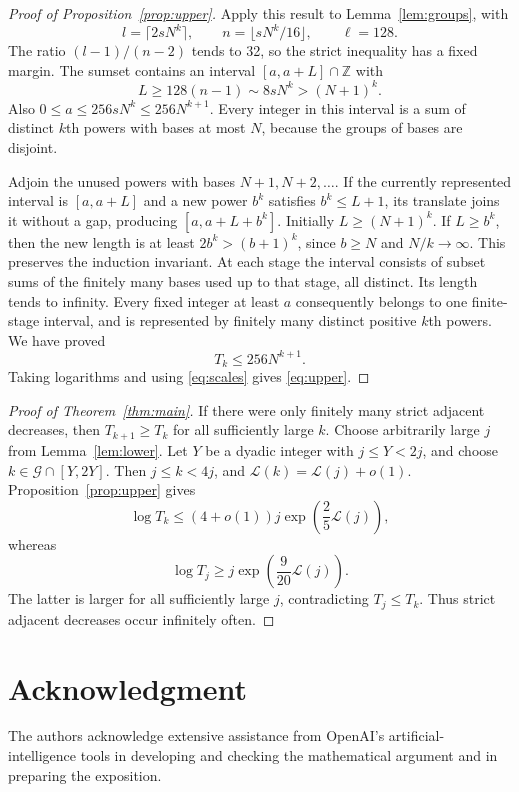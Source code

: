 \documentclass[11pt]{amsart}
\numberwithin{equation}{section}
\theoremstyle{remark}
\newcommand{\Z}{\mathbb Z}
\begin{document}
\begin{proof}[Proof of Proposition~\ref{prop:upper}]
Apply this result to Lemma~\ref{lem:groups}, with
\[
 l=\lceil2sN^k\rceil,\qquad n=\lfloor sN^k/16\rfloor,\qquad \ell=128.
\]
The ratio \((l-1)/(n-2)\) tends to 32, so the strict inequality has
a fixed margin. The sumset contains an interval \([a,a+L]\cap\Z\)
with
\[
 L\ge128(n-1)\sim8sN^k>(N+1)^k.
\]
Also \(0\le a\le256sN^k\le256N^{k+1}\).
Every integer in this interval is a sum of distinct \(k\)th powers
with bases at most \(N\), because the groups of bases are disjoint.

Adjoin the unused powers with bases \(N+1,N+2,\ldots\).
If the currently represented interval is \([a,a+L]\) and a new power
\(b^k\) satisfies \(b^k\le L+1\), its translate joins it without a gap,
producing \([a,a+L+b^k]\).
Initially \(L\ge(N+1)^k\).
If \(L\ge b^k\), then the new length is at least \(2b^k>(b+1)^k\),
since \(b\ge N\) and \(N/k\to\infty\).
This preserves the induction invariant.
At each stage the interval consists of subset sums of the finitely
many bases used up to that stage, all distinct. Its length tends to
infinity. Every fixed integer at least \(a\) consequently belongs
to one finite-stage interval, and is represented by finitely many
distinct positive \(k\)th powers. We have proved
\[
 T_k\le256N^{k+1}.
\]
Taking logarithms and using \eqref{eq:scales} gives \eqref{eq:upper}.
\end{proof}

\begin{proof}[Proof of Theorem~\ref{thm:main}]
If there were only finitely many strict adjacent decreases, then
\(T_{k+1}\ge T_k\) for all sufficiently large \(k\).
Choose arbitrarily large \(j\) from Lemma~\ref{lem:lower}.
Let \(Y\) be a dyadic integer with \(j\le Y<2j\), and choose
\(k\in\mathcal G\cap[Y,2Y]\).
Then \(j\le k<4j\), and
\(\mathcal L(k)=\mathcal L(j)+o(1)\).
Proposition~\ref{prop:upper} gives
\[
 \log T_k\le(4+o(1))j\exp\!\left(\frac25\mathcal L(j)\right),
\]
whereas
\[
 \log T_j\ge j\exp\!\left(\frac9{20}\mathcal L(j)\right).
\]
The latter is larger for all sufficiently large \(j\), contradicting
\(T_j\le T_k\). Thus strict adjacent decreases occur infinitely often.
\end{proof}

\section*{Acknowledgment}
The authors acknowledge extensive assistance from OpenAI's
artificial-intelligence tools in developing and checking the
mathematical argument and in preparing the exposition.
\end{document}
